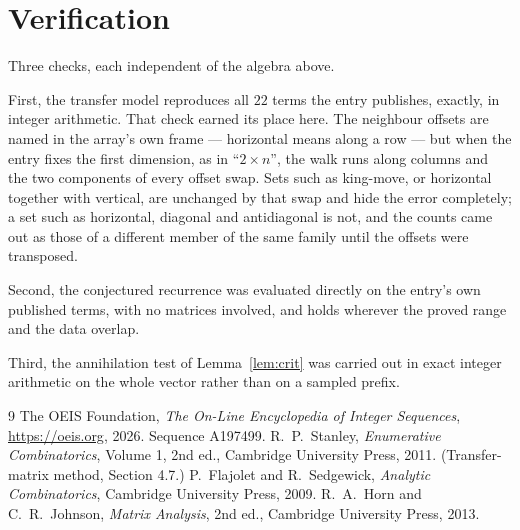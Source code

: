 \documentclass[11pt,a4paper]{article}
\theoremstyle{plain}
\theoremstyle{definition}
\begin{document}
\section{Verification}

Three checks, each independent of the algebra above.

First, the transfer model reproduces all $22$ terms the entry publishes, exactly, in
integer arithmetic. That check earned its place here. The neighbour offsets are named in the
array's own frame --- horizontal means along a row --- but when the entry fixes the first
dimension, as in ``$2\times n$'', the walk runs along columns and the two components of every
offset swap. Sets such as king-move, or horizontal together with vertical, are unchanged by
that swap and hide the error completely; a set such as horizontal, diagonal and antidiagonal
is not, and the counts came out as those of a different member of the same family until the
offsets were transposed.

Second, the conjectured recurrence was evaluated directly on the entry's own published terms,
with no matrices involved, and holds wherever the proved range and the data overlap.

Third, the annihilation test of Lemma~\ref{lem:crit} was carried out in exact integer
arithmetic on the whole vector rather than on a sampled prefix.

\begin{thebibliography}{9}
 The OEIS Foundation, \emph{The On-Line Encyclopedia of Integer
Sequences}, \url{https://oeis.org}, 2026. Sequence A197499.
 R.~P.~Stanley, \emph{Enumerative Combinatorics}, Volume 1, 2nd ed.,
Cambridge University Press, 2011. (Transfer-matrix method, Section 4.7.)
 P.~Flajolet and R.~Sedgewick, \emph{Analytic Combinatorics}, Cambridge
University Press, 2009.
 R.~A.~Horn and C.~R.~Johnson, \emph{Matrix Analysis}, 2nd ed., Cambridge
University Press, 2013.
\end{thebibliography}
\end{document}

